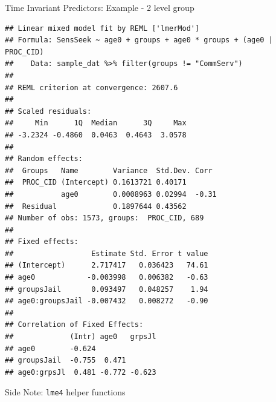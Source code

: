 \begin{frame}[fragile]{Time Invariant Predictors: Example - 2 level
group}

\tiny

\begin{Shaded}
\end{Shaded}

\tiny

\begin{verbatim}
## Linear mixed model fit by REML ['lmerMod']
## Formula: SensSeek ~ age0 + groups + age0 * groups + (age0 | PROC_CID)
##    Data: sample_dat %>% filter(groups != "CommServ")
## 
## REML criterion at convergence: 2607.6
## 
## Scaled residuals: 
##     Min      1Q  Median      3Q     Max 
## -3.2324 -0.4860  0.0463  0.4643  3.0578 
## 
## Random effects:
##  Groups   Name        Variance  Std.Dev. Corr 
##  PROC_CID (Intercept) 0.1613721 0.40171       
##           age0        0.0008963 0.02994  -0.31
##  Residual             0.1897644 0.43562       
## Number of obs: 1573, groups:  PROC_CID, 689
## 
## Fixed effects:
##                  Estimate Std. Error t value
## (Intercept)      2.717417   0.036423   74.61
## age0            -0.003998   0.006382   -0.63
## groupsJail       0.093497   0.048257    1.94
## age0:groupsJail -0.007432   0.008272   -0.90
## 
## Correlation of Fixed Effects:
##             (Intr) age0   grpsJl
## age0        -0.624              
## groupsJail  -0.755  0.471       
## age0:grpsJl  0.481 -0.772 -0.623
\end{verbatim}

\normalsize

\end{frame}

\begin{frame}[fragile]{Side Note: \texttt{lme4} helper functions}

\begin{Shaded}
\begin{Highlighting}[]
 \NormalTok{)}
\OperatorTok{::}
\OperatorTok{::}
\end{Highlighting}
\end{Shaded}

\end{frame}

